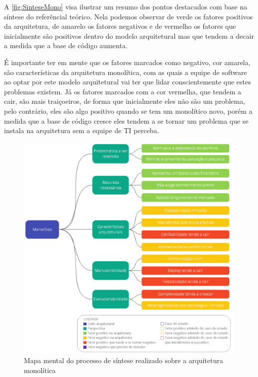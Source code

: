 \newpage

A \autoref{fig:SinteseMono} visa ilustrar um resumo dos pontos destacados com base na síntese do
referêncial teórico. Nela podemos observar de verde os fatores positivos da arquitetura, de amarelo
os fatores negativos e de vermelho os fatores que inicialmente são positivos dentro do modelo
arquitetural mas que tendem a decair a medida que a base de código aumenta.

É importante ter em mente que os fatores marcados como negativo, cor amarela, são características da
arquitetura monolítica, com as quais a equipe de software ao optar por este modelo arquitetural vai
ter que lidar conscientemente que estes problemas existem. Já os fatores marcados com a cor
vermelha, que tendem a cair, são mais traiçoeiros, de forma que inicialmente eles não são um
problema, pelo contrário, eles são algo positivo quando se tem um monolítico novo, porém a medida que
a base de código cresce eles tendem a se tornar um problema que se instala na arquitetura sem a
equipe de \gls{TI} perceba.

\begin{figure}[h]
  \centering
  \includegraphics[keepaspectratio=true,scale=1]{figuras/sintese-monolitico.eps}
  \caption{Mapa mental do processo de síntese realizado sobre a arquitetura monolítica\label{fig:SinteseMono}}
\end{figure}

